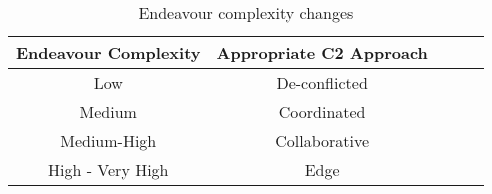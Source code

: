 \begin{table}[ht]
	\small
	\fontsize{10}{10}\selectfont
	\centering
	\caption{Endeavour complexity  changes}
	\label{table:table02}
	
	\begin{tabular}{ccccc}
	\hline
		\textbf{Endeavour Complexity}
		& \textbf{Appropriate C2 Approach} \\ [1ex]
	\hline	
	
	Low & De-conflicted \\[1ex]
	Medium & Coordinated \\[1ex]
	Medium-High & Collaborative \\[1ex]
	High - Very High & Edge \\[1ex]
	\hline
	\end{tabular}
\end{table} 
